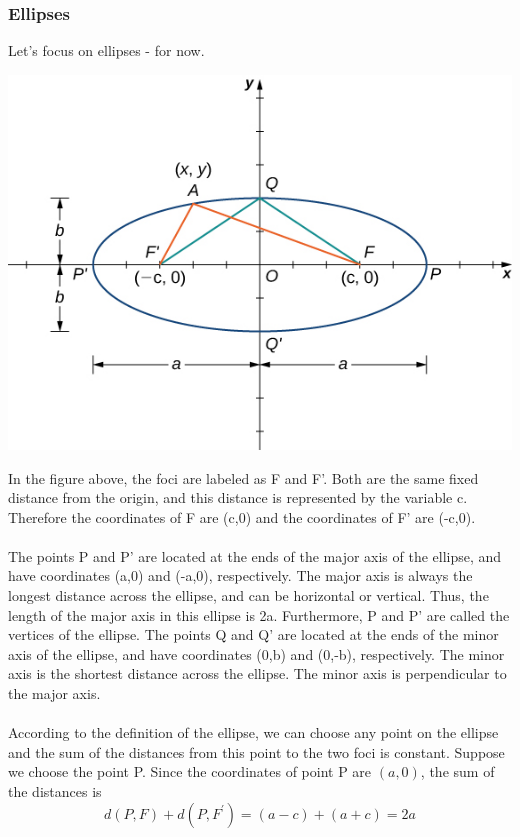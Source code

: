 \documentclass[12pt,addpoints]{exam}
\begin{document}
	\subsubsection*{Ellipses}
	Let's focus on ellipses - for now.
	\begin{center}
		\includegraphics[scale=1.0]{ellipse.png}
	\end{center}
	In the figure above, the foci are labeled as F and F'. Both are the same fixed distance from the origin, and this distance is represented by the variable c. Therefore the coordinates of F are (c,0) and the coordinates of  F' are (-c,0). \\ \\
	The points P and  P' are located at the ends of the major axis of the ellipse, and have coordinates (a,0) and (-a,0), respectively. The major axis is always the longest distance across the ellipse, and can be horizontal or vertical. Thus, the length of the major axis in this ellipse is  2a. Furthermore, P and P' are called the vertices of the ellipse. The points Q and  Q' are located at the ends of the minor axis of the ellipse, and have coordinates  (0,b) and  (0,-b), respectively. The minor axis is the shortest distance across the ellipse. The minor axis is perpendicular to the major axis. \\ \\
	According to the definition of the ellipse, we can choose any point on the ellipse and the sum of the distances from this point to the two foci is constant. Suppose we choose the point P. Since the coordinates of point P are $(a,0)$, the sum of the distances is
	$$d(P,F)+d(P,F^{\prime})=(a-c)+(a+c)=2a$$
\end{document}

